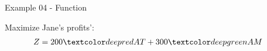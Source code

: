 \begin{frame}{Example 04 - Function}

Maximize Jane's profits':
\begin{align*}
    Z &= 200\colora{AT} + 300\colorb{AM}
\end{align*}

\end{frame}
